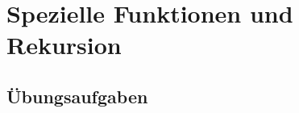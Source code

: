 %
%
%
\chapter{Spezielle Funktionen und Rekursion
\label{buch:chapter:rekursion}}
\rhead{}





\section*{Übungsaufgaben}
\begin{uebungsaufgaben}
\end{uebungsaufgaben}


